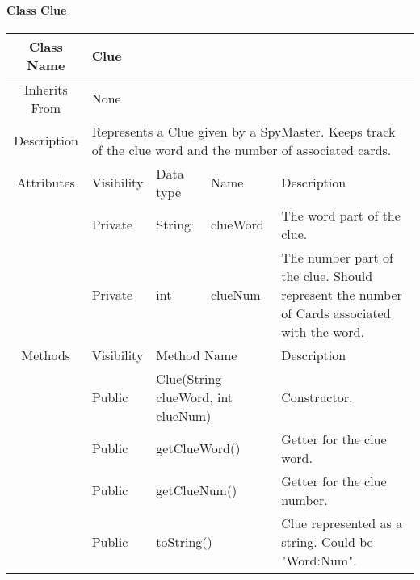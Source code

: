 \paragraph{Class Clue}\mbox{}

\begin{tabularx}{\textwidth}{|c||l|l|l|X|}
    \hline
    \cellcolor{lightgray}Class Name & \multicolumn{4}{X|}{Clue}\\
    \hline
    \cellcolor{lightgray}Inherits From & \multicolumn{4}{X|}{None}\\
    \hline
    \cellcolor{lightgray}Description & \multicolumn{4}{p{12cm}|}{Represents a Clue given by a SpyMaster. Keeps track of the clue word and the number of associated cards. }\\

    \hline\hline
    \cellcolor{lightgray}Attributes & \cellcolor{lightgray}Visibility & \cellcolor{lightgray}Data type & \cellcolor{lightgray}Name & \cellcolor{lightgray}Description\\\cline{2-5}
    \cellcolor{lightgray} & Private & String & clueWord & The word part of the clue.\\
    \hline    
    \cellcolor{lightgray} & Private & int & clueNum & The number part of the clue. Should represent the number of Cards associated with the word. \\
    \hline\hline
    \cellcolor{lightgray}Methods & \cellcolor{lightgray}Visibility & \multicolumn{2}{l|}{\cellcolor{lightgray}Method Name} & \cellcolor{lightgray}Description\\\cline{2-5}
    \hline
    \cellcolor{lightgray} & Public & \multicolumn{2}{X|}{Clue(String clueWord, int clueNum)} & Constructor.\\
    \hline
    \cellcolor{lightgray} & Public & \multicolumn{2}{l|}{getClueWord()} & Getter for the clue word. \\
    \hline
    \cellcolor{lightgray} & Public & \multicolumn{2}{l|}{getClueNum()} & Getter for the clue number. \\
    \hline
    \cellcolor{lightgray} & Public & \multicolumn{2}{l|}{toString()} & Clue represented as a string. Could be "Word:Num".\\
    \hline
\end{tabularx}